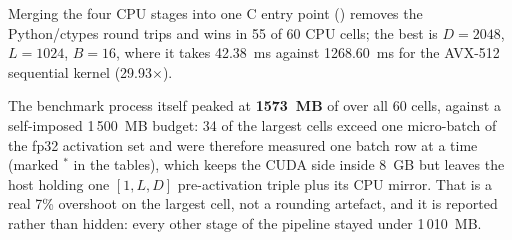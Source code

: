 Merging the four CPU stages into one C entry point () removes the Python/ctypes round trips and wins in 55 of 60 CPU cells; the best is $D=2048$, $L=1024$, $B=16$, where it takes 42.38~ms against 1268.60~ms for the AVX-512 sequential kernel (29.93$\times$).

The benchmark process itself peaked at \textbf{1573~MB} of  over all 60 cells, against a self-imposed 1\,500~MB budget: 34 of the largest cells exceed one micro-batch of the fp32 activation set and were therefore measured one batch row at a time (marked $^{*}$ in the tables), which keeps the CUDA side inside 8~GB but leaves the host holding one $[1,L,D]$ pre-activation triple plus its CPU mirror. That is a real 7\% overshoot on the largest cell, not a rounding artefact, and it is reported rather than hidden: every other stage of the pipeline stayed under 1\,010~MB.
